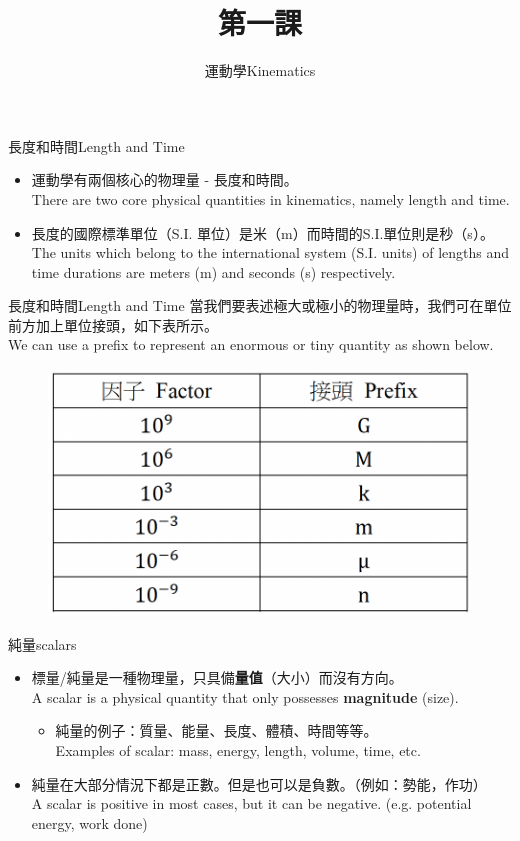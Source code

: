 \documentclass[beamer=true]{standalone}
\title{第一課}
\author{運動學Kinematics}
\institute{全年班}
\date{}
\begin{document}
\frame{\titlepage}

\begin{frame}{長度和時間Length and Time}
    \begin{itemize}
        \item 運動學有兩個核心的物理量 - 長度和時間。\\There are two core physical quantities in kinematics, namely length and time.
        \item 長度的國際標準單位（S.I. 單位）是米（m）而時間的S.I.單位則是秒（s）。\\The units which belong to the international system (S.I. units) of lengths and time durations are meters (m) and seconds (s) respectively.
    \end{itemize}
\end{frame}
\begin{frame}{長度和時間Length and Time}
    當我們要表述極大或極小的物理量時，我們可在單位前方加上單位接頭，如下表所示。\\We can use a prefix to represent an enormous or tiny quantity as shown below.
    \begin{figure}[h!]
        \centering
        \includegraphics[width=.5\textwidth]{../../assets/3d0d2672.png}
    \end{figure}
\end{frame}

\begin{frame}{純量scalars}
    \begin{itemize}
        \item 標量/純量是一種物理量，只具備\textbf{量值}（大小）而沒有方向。\\A scalar is a physical quantity that only possesses \textbf{magnitude} (size).
              \begin{itemize}
                  \item 純量的例子：質量、能量、長度、體積、時間等等。\\Examples of scalar: mass, energy, length, volume, time, etc.
              \end{itemize}
        \item 純量在大部分情況下都是正數。但是也可以是負數。（例如：勢能，作功）\\A scalar is positive in most cases, but it can be negative. (e.g. potential energy, work done)
    \end{itemize}
\end{frame}
\end{document}
